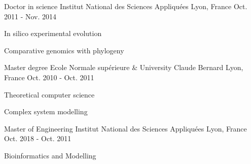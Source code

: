 

\begin{cventries}

  \cventry
  {Doctor in science} %
  {Institut National des Sciences Appliquées} %
  {Lyon, France} %
  {Oct. 2011 - Nov. 2014} %
  {
    \begin{cvitems} %
      \item {In silico experimental evolution}
      \item {Comparative genomics with phylogeny}
    \end{cvitems}
  }

  \cventry
  {Master degree} %
  {Ecole Normale supérieure \& University Claude Bernard} %
  {Lyon, France} %
  {Oct. 2010 - Oct. 2011} %
  {
    \begin{cvitems} %
      \item {Theoretical computer science}
      \item {Complex system modelling}
    \end{cvitems}
  }

  \cventry
  {Master of Engineering} %
  {Institut National des Sciences Appliquées} %
  {Lyon, France} %
  {Oct. 2018 - Oct. 2011} %
  {
    \begin{cvitems} %
      \item {Bioinformatics and Modelling}
    \end{cvitems}
  }

\end{cventries}
